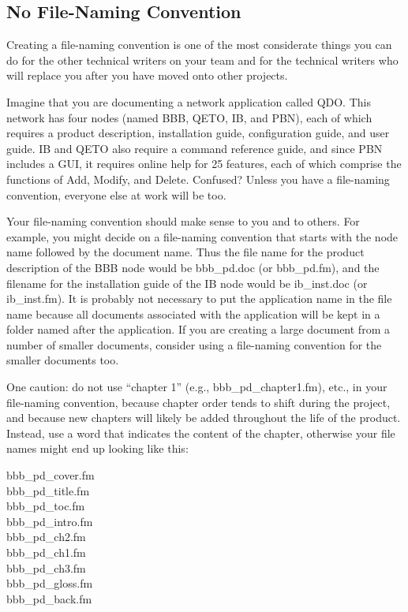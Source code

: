 \documentclass[12pt]{article}
\begin{document}
\subsection{No File-Naming Convention}
Creating a file-naming convention is one of the most considerate things you can do for the other technical writers on your team and for the technical writers who will replace you after you have moved onto other projects.

Imagine that you are documenting a network application called QDO. This network has four nodes (named BBB, QETO, IB, and PBN), each of which requires a product description, installation guide, configuration guide, and user guide. IB and QETO also require a
command reference guide, and since PBN includes a GUI, it requires online help for 25 features, each of which comprise the functions of Add, Modify, and Delete. Confused? Unless you have a file-naming convention, everyone else at work will be too.

Your file-naming convention should make sense to you and to others. For example, you might decide on a file-naming convention that
starts with the node name followed by the document name. Thus the file name for the product description of the BBB node would be bbb\_pd.doc (or bbb\_pd.fm), and the filename for the installation guide of the IB node would be ib\_inst.doc (or ib\_inst.fm). It is probably not necessary to put the application name in the file name because all documents associated with the application will be kept in a folder named after the application. If you are creating a large document from a number of smaller documents, consider using a file-naming convention for the smaller documents too.

One caution: do not use ``chapter 1'' (e.g., bbb\_pd\_chapter1.fm), etc., in your file-naming convention, because chapter order tends to shift during the project, and because new chapters will likely be added throughout the life of the product. Instead, use a word that indicates the content of the chapter, otherwise your file names might end up looking like this:

bbb\_pd\_cover.fm\\bbb\_pd\_title.fm\\bbb\_pd\_toc.fm\\bbb\_pd\_intro.fm\\bbb\_pd\_ch2.fm\\bbb\_pd\_ch1.fm\\bbb\_pd\_ch3.fm\\bbb\_pd\_gloss.fm\\bbb\_pd\_back.fm
\end{document}

